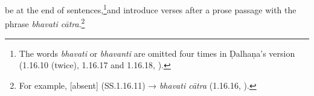 be at the end of sentences,\footnote{The words \emph{bhavati} or \emph{bhavanti} are omitted four times in Ḍalhaṇa's version (1.16.10 (twice), 1.16.17 and 1.16.18, \cite[77, 79]{vulgate}).}and introduce verses after a prose passage with the phrase \emph{bhavati cātra}.\footnote{For example, [absent] (SS.1.16.11) → \emph{bhavati cātra} (1.16.16, \cite[79]{vulgate}).} 










